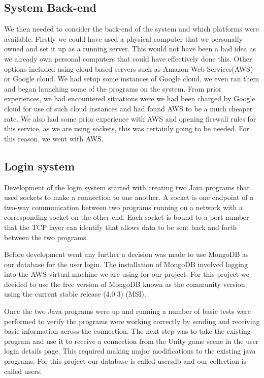 \subsection {System Back-end}
We then needed to consider the back-end of the system and which platforms were available. Firstly we could have used a physical computer that we personally owned and set it up as a running server. This would not have been a bad idea as we already own personal computers that could have effectively done this. Other options included using cloud based servers such as Amazon Web Services(AWS) or Google cloud. We had setup some instances of Google cloud, we even ran them and began launching some of the programs on the system. From prior experiences, we had encountered situations were we had been charged by Google cloud for use of such cloud instances and had found AWS to be a much cheaper rate. We also had some prior experience with AWS and opening firewall rules for this service, as we are using sockets, this was certainly going to be needed. For this reason, we went with AWS.\newline

\subsection {Login system}\newline
Development of the login system started with creating two Java programs that used sockets to make a connection to one another. A socket is one endpoint of a two-way communication between two programs running on a network with a corresponding socket on the other end. Each socket is bound to a port number that the TCP layer can identify that allows data to be sent back and forth between the two programs.\newline

Before development went any further a decision was made to use MongoDB as our database for the user login. The installation of MongoDB involved logging into the AWS virtual machine we are using for our project. For this project we decided to use the free version of MongoDB known as the community version, using the current stable release (4.0.3) (MSI).\newline

Once the two Java programs were up and running a number of basic tests were performed to verify the programs were working correctly by sending and receiving basic information across the connection. The next step was to take the existing program and use it to receive a connection from the Unity game scene in the user login details page. This required making major modifications to the existing java programs. For this project our database is called usersdb and our collection is called users. \newline

